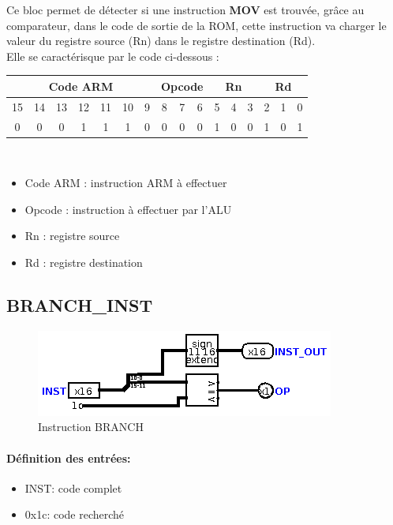 \documentclass[a4paper]{article} %
\begin{document}
Ce bloc permet de détecter si une instruction \textbf{MOV} est trouvée, grâce au comparateur, dans le code de sortie de la ROM, cette instruction va charger le valeur du registre source (Rn) dans le registre destination (Rd).\\
Elle se caractérisque par le code ci-dessous : 
\\
\begin{tabular}{|ccccccc|ccc|ccc|ccc|}
    \hline
    \multicolumn{7}{|c|}{Code ARM}  & \multicolumn{3}{|c|}{Opcode} & \multicolumn{3}{|c|}{Rn} & \multicolumn{3}{|c|}{Rd}\\
    \hline
    15 & 14 & 13 & 12 & 11 & 10 & 9 & 8 & 7 & 6                    & 5 & 4 & 3                & 2 & 1 & 0 \\
    \hline
    0  & 0  & 0  & 1  & 1  & 1  & 0 & 0 & 0 & 0                    & 1 & 0 & 0                & 1 & 0 & 1 \\
    \hline     
    \end{tabular}
\\
\begin{itemize}
    \item     Code ARM : instruction ARM à effectuer
    \item     Opcode : instruction à effectuer par l'ALU
    \item     Rn : registre source
    \item     Rd : registre destination
\end{itemize}


\subsection{BRANCH\_INST}
\begin{figure}[H]
    \centering
    \includegraphics[width=.8\textwidth]{src/BRANCH_INST.png}
    \caption{Instruction BRANCH}
    \label{branch}
\end{figure}

\paragraph{Définition des entrées:}
\begin{itemize}
    \item     INST: code complet
    \item     0x1c: code recherché
\end{itemize}
\end{document}
